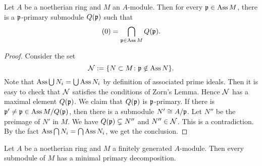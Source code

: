         \begin{theorem}\label{thm: primary decomposition for general module}
            Let $A$ be a noetherian ring and $M$ an $A$-module.
            Then for every ${\mathfrak{p}} \in \operatorname{Ass} M$, there is a ${\mathfrak{p}}$-primary submodule $Q({\mathfrak{p}})$ such that 
            \[ (0) = \bigcap_{{\mathfrak{p}} \in \operatorname{Ass} M} Q({\mathfrak{p}}). \] 
        \end{theorem}
        \begin{proof}
            Consider the set 
            \[ {\mathcal{N}}:= \{N \subset M \colon {\mathfrak{p}} \notin \operatorname{Ass} N \}. \]
            Note that $\operatorname{Ass} \bigcup N_i = \bigcup \operatorname{Ass} N_i$ by definition of associated prime ideals.
            Then it is easy to check that ${\mathcal{N}}$ satisfies the conditions of Zorn's Lemma.
            Hence ${\mathcal{N}}$ has a maximal element $Q({\mathfrak{p}})$.
            We claim that $Q({\mathfrak{p}})$ is ${\mathfrak{p}}$-primary.
            If there is ${\mathfrak{p}}' \neq {\mathfrak{p}} \in \operatorname{Ass} M/Q({\mathfrak{p}})$, then there is a submodule $N' \cong A/{\mathfrak{p}}$.
            Let $N''$ be the preimage of $N'$ in $M$.
            We have $Q({\mathfrak{p}}) \subsetneq N''$ and $N'' \in {\mathcal{N}}$.
            This is a contradiction.
            By the fact $\operatorname{Ass} \bigcap N_i = \bigcap \operatorname{Ass} N_i$, we get the conclusion.
        \end{proof}

        \begin{corollary}\label{cor: primary decomposition for finitely generated module}
            Let $A$ be a noetherian ring and $M$ a finitely generated $A$-module.
            Then every submodule of $M$ has a minimal primary decomposition.
        \end{corollary}